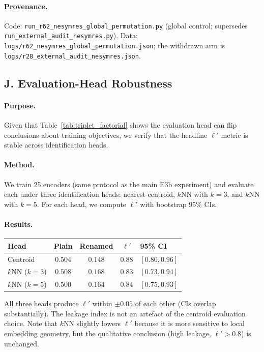 \paragraph{Provenance.} Code: \texttt{run\_r62\_nesymres\_global\_permutation.py} (global control; supersedes \texttt{run\_external\_audit\_nesymres.py}). Data: \texttt{logs/r62\_nesymres\_global\_permutation.json}; the withdrawn arm is \texttt{logs/r28\_external\_audit\_nesymres.json}.

\subsection*{J. Evaluation-Head Robustness}

\paragraph{Purpose.} Given that Table~\ref{tab:triplet_factorial} shows the evaluation head can flip conclusions about training objectives, we verify that the headline $\ell'$ metric is stable across identification heads.

\paragraph{Method.} We train 25 encoders (same protocol as the main E3b experiment) and evaluate each under three identification heads: nearest-centroid, $k$NN with $k{=}3$, and $k$NN with $k{=}5$. For each head, we compute $\ell'$ with bootstrap 95\% CIs.

\paragraph{Results.}
\begin{center}
\small
\begin{tabular}{lcccl}
\toprule
Head & Plain & Renamed & $\ell'$ & 95\% CI \\
\midrule
Centroid & $0.504$ & $0.148$ & $0.88$ & $[0.80, 0.96]$ \\
$k$NN ($k{=}3$) & $0.508$ & $0.168$ & $0.83$ & $[0.73, 0.94]$ \\
$k$NN ($k{=}5$) & $0.500$ & $0.164$ & $0.84$ & $[0.75, 0.93]$ \\
\bottomrule
\end{tabular}
\end{center}
All three heads produce $\ell'$ within $\pm 0.05$ of each other (CIs overlap substantially). The leakage index is not an artefact of the centroid evaluation choice. Note that $k$NN slightly lowers $\ell'$ because it is more sensitive to local embedding geometry, but the qualitative conclusion (high leakage, $\ell' > 0.8$) is unchanged.

